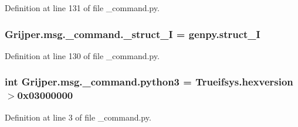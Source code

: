 Definition at line 131 of file \-\_\-command.\-py.

\subsubsection[{\-\_\-struct\-\_\-\-I}]{\setlength{\rightskip}{0pt plus 5cm}Grijper.\-msg.\-\_\-command.\-\_\-struct\-\_\-\-I = genpy.\-struct\-\_\-\-I}\label{namespaceGrijper_1_1msg_1_1__command_a5c9fb91d9a5a7e269504d6520a909bd9}


Definition at line 130 of file \-\_\-command.\-py.

\subsubsection[{python3}]{\setlength{\rightskip}{0pt plus 5cm}int Grijper.\-msg.\-\_\-command.\-python3 = Trueifsys.\-hexversion$>$0x03000000}\label{namespaceGrijper_1_1msg_1_1__command_a5dc7b703c730a5bcfb1f04a41b184498}


Definition at line 3 of file \-\_\-command.\-py.

